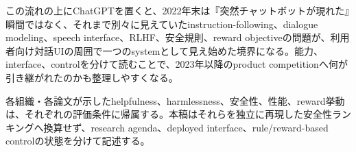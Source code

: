この流れの上にChatGPTを置くと、2022年末は『突然チャットボットが現れた』瞬間ではなく、それまで別々に見えていたinstruction-following、dialogue modeling、speech interface、RLHF、安全規則、reward objectiveの問題が、利用者向け対話UIの周囲で一つのsystemとして見え始めた境界になる。能力、interface、controlを分けて読むことで、2023年以降のproduct competitionへ何が引き継がれたのかも整理しやすくなる。\autocite{src-1a032a768300,src-2a9e3cfb3148,src-2b132b9f05ef,src-7ef567047bd7,src-81cf88ab9c36,src-83ce66a102c3,src-bc1a61aec959,src-ce2ca3d4fe8f,src-d7f602cae828,src-f4ecc26bd1e5}


\begin{claimboundary}
各組織・各論文が示したhelpfulness、harmlessness、安全性、性能、reward挙動は、それぞれの評価条件に帰属する。本稿はそれらを独立に再現した安全性ランキングへ換算せず、research agenda、deployed interface、rule/reward-based controlの状態を分けて記述する。\autocite{src-1a032a768300,src-83ce66a102c3,src-f4ecc26bd1e5}
\end{claimboundary}
